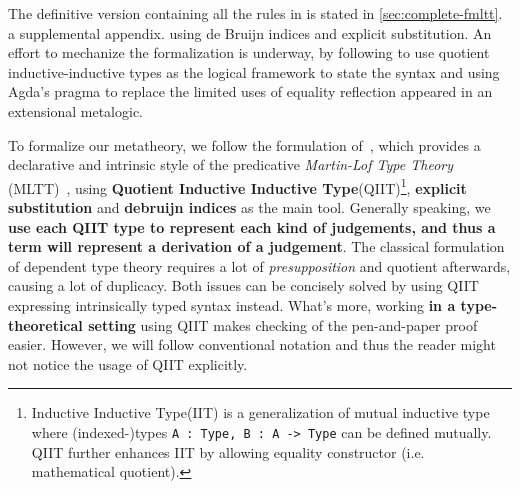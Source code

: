 The definitive version containing all the rules in \TT is stated in
\ifreport \cref{sec:complete-fmltt}.
\else a supplemental appendix.
\fi
using de Bruijn indices and explicit substitution.
An effort to mechanize the formalization is underway, by following  \citet{altkap2016} 
to use quotient inductive-inductive types as 
the logical framework to state the syntax and using Agda's
 pragma to replace the limited uses of equality reflection appeared in 
an extensional meta\-logic. 


%



\ifShowOldWriting
\newpage

To formalize our metatheory, we follow the formulation of~\citet{altkap2016}, which provides a declarative and intrinsic style of the predicative \textit{Martin-Lof Type Theory} (MLTT)~\cite{martin1982constructive},
using \textbf{Quotient Inductive Inductive Type}(QIIT)\footnote{Inductive Inductive Type(IIT) is a generalization of mutual inductive type where (indexed-)types \texttt{A : Type, B : A -> Type} can be defined mutually. QIIT further enhances IIT by allowing equality constructor (i.e. mathematical quotient).}, \textbf{explicit substitution} and \textbf{debruijn indices} as the main tool. 
Generally speaking, we \textbf{use each QIIT type to represent each kind of judgements, and thus a term will represent a derivation of a judgement}. The classical formulation of dependent type theory requires a lot of \textit{presupposition} and quotient afterwards, causing a lot of duplicacy. Both issues can be concisely solved by using QIIT expressing intrinsically typed syntax instead. What's more, working \textbf{in a type-theoretical setting} using QIIT makes checking of the pen-and-paper proof easier. However, we will follow conventional notation and thus the reader might not notice the usage of QIIT explicitly.

